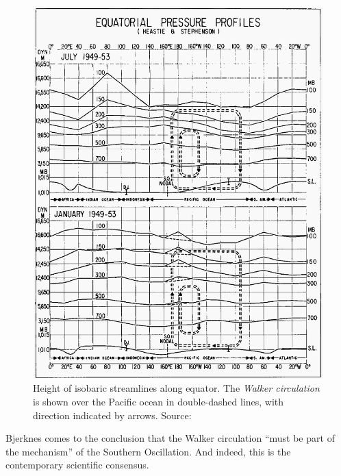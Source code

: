 \begin{figure}[t]
  \centering
  \includegraphics[width=0.9\linewidth]{figures/equatorial-pressure-profiles.png}
  \caption{Height of isobaric streamlines along equator. The \emph{Walker
      circulation} is shown over the Pacific ocean in double-dashed lines, with
    direction indicated by arrows. Source: \citet{bjerknes1969}}
  \label{fig:pressureprofiles}
\end{figure}

Bjerknes comes to the conclusion that the Walker circulation ``must be part of
the mechanism'' of the Southern Oscillation. And indeed, this is the
contemporary scientific consensus.



